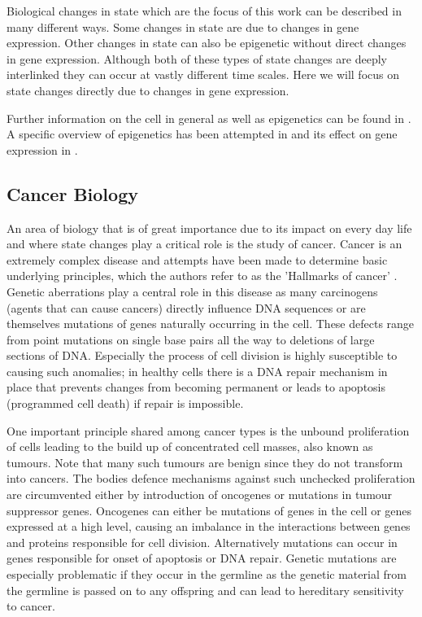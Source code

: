 Biological changes in state which are the focus of this work can be described in many different ways. Some changes in state are due to changes in gene expression. Other changes in state can also be epigenetic without direct changes in gene expression. Although both of these types of state changes are deeply interlinked they can occur at vastly different time scales. Here we will focus on state changes directly due to changes in gene expression.  

Further information on the cell in general as well as epigenetics can be found in \cite[Chapters~1,7]{Alberts:2007tv}. A specific overview of epigenetics has been attempted in \cite{Goldberg:2007tl} and its effect on gene expression in \cite{Gibney:2010ws}. 

\subsection{Cancer Biology}
\label{sec:cancer-biology}

An area of biology that is of great importance due to its impact on every day life and where state changes play a critical role is the study of cancer. Cancer is an extremely complex disease and attempts have been made to determine basic underlying principles, which the authors refer to as the 'Hallmarks of cancer' \citep{Hannah:2000wo, Hanahan:2011gu}. Genetic aberrations play a central role in this disease as many carcinogens (agents that can cause cancers) directly influence DNA sequences or are themselves mutations of genes naturally occurring in the cell. These defects range from point mutations on single base pairs all the way to deletions of large sections of DNA. Especially the process of cell division is highly susceptible to causing such anomalies; in healthy cells there is a DNA repair mechanism in place that prevents  changes from becoming permanent or leads to apoptosis (programmed cell death) if repair is impossible. 

One important principle shared among cancer types is the unbound proliferation of cells leading to the build up of concentrated cell masses, also known as tumours. Note that many such tumours are benign since they do not transform into cancers. The bodies defence mechanisms against such unchecked proliferation are circumvented either by introduction of oncogenes or mutations in tumour suppressor genes. Oncogenes can either be mutations of genes in the cell or genes expressed at a high level, causing an imbalance in the interactions between genes and proteins responsible for cell division. Alternatively mutations can occur in genes responsible for onset of apoptosis or DNA repair. Genetic mutations are especially problematic if they occur in the germline as the genetic material from the germline is passed on to any offspring and can lead to hereditary sensitivity to cancer.

